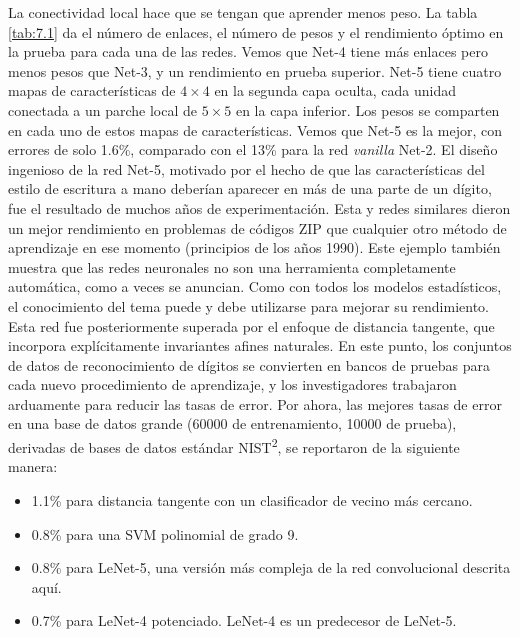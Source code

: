 La conectividad local hace que se tengan que aprender menos peso. La tabla \ref{tab:7.1} da el número de enlaces, el número de pesos y el rendimiento óptimo en la prueba para cada una de las redes. Vemos que Net-4 tiene más enlaces pero menos pesos que Net-3, y un rendimiento en prueba superior. Net-5 tiene cuatro mapas de características de $4 \times 4$ en la segunda capa oculta, cada unidad conectada a un parche local de $5 \times 5$ en la capa inferior. Los pesos se comparten en cada uno de estos mapas de características. Vemos que Net-5 es la mejor, con errores de solo 1.6\%, comparado con el 13\% para la red \textit{vanilla} Net-2. El diseño ingenioso de la red Net-5, motivado por el hecho de que las características del estilo de escritura a mano deberían aparecer en más de una parte de un dígito, fue el resultado de muchos años de experimentación. Esta y redes similares dieron un mejor rendimiento en problemas de códigos ZIP que cualquier otro método de aprendizaje en ese momento (principios de los años 1990). Este ejemplo también muestra que las redes neuronales no son una herramienta completamente automática, como a veces se anuncian. Como con todos los modelos estadísticos, el conocimiento del tema puede y debe utilizarse para mejorar su rendimiento. \\

Esta red fue posteriormente superada por el enfoque de distancia tangente, que incorpora explícitamente invariantes afines naturales. En este punto, los conjuntos de datos de reconocimiento de dígitos se convierten en bancos de pruebas para cada nuevo procedimiento de aprendizaje, y los investigadores trabajaron arduamente para reducir las tasas de error. Por ahora, las mejores tasas de error en una base de datos grande (60000 de entrenamiento, 10000 de prueba), derivadas de bases de datos estándar NIST\textsuperscript{2}, se reportaron de la siguiente manera:
\begin{itemize}
\item 1.1\% para distancia tangente con un clasificador de vecino más cercano.
\item 0.8\% para una SVM polinomial de grado 9.
\item 0.8\% para LeNet-5, una versión más compleja de la red convolucional descrita aquí.
\item 0.7\% para LeNet-4 potenciado. LeNet-4 es un predecesor de LeNet-5.
\end{itemize}



